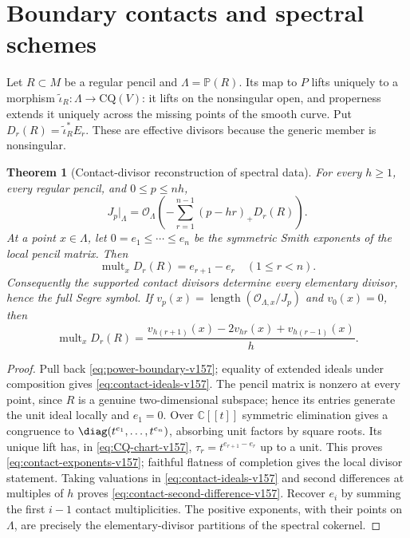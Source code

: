 \documentclass[11pt,reqno]{amsart}
\numberwithin{equation}{section}
\newtheorem{theorem}{Theorem}[section]
\theoremstyle{definition}\newtheorem{definition}[theorem]{Definition}
\theoremstyle{remark}\newtheorem{remark}[theorem]{Remark}
\newcommand{\C}{\mathbb C}\newcommand{\Q}{\mathbb Q}
\newcommand{\Pj}{\mathbb P}\newcommand{\A}{\mathbb A}
\newcommand{\OO}{\mathcal O}\newcommand{\II}{\mathcal I}
\DeclareMathOperator{\length}{length}
\begin{document}
\section{Boundary contacts and spectral schemes}
\label{sec:boundary-contacts-v157}
Let $R\subset M$ be a regular pencil and $\Lambda=\Pj(R)$. Its map
to $P$ lifts uniquely to a morphism
$\widetilde\iota_R:\Lambda\to\mathrm{CQ}(V)$: it lifts on the
nonsingular open, and properness extends it uniquely across the missing
points of the smooth curve. Put
$D_r(R)=\widetilde\iota_R^*E_r$. These are effective divisors because
the generic member is nonsingular.

\begin{theorem}[Contact-divisor reconstruction of spectral data]
\label{thm:contact-Segre-v157}
For every $h\geq1$, every regular pencil, and $0\leq p\leq nh$,
\begin{equation}\label{eq:contact-ideals-v157}
 J_p|_\Lambda=\OO_\Lambda\left(-\sum_{r=1}^{n-1}(p-hr)_+D_r(R)\right).
\end{equation}
At a point $x\in\Lambda$, let $0=e_1\leq\cdots\leq e_n$ be the
symmetric Smith exponents of the local pencil matrix. Then
\begin{equation}\label{eq:contact-exponents-v157}
 \operatorname{mult}_xD_r(R)=e_{r+1}-e_r\quad(1\leq r<n).
\end{equation}
Consequently the supported contact divisors determine every elementary
divisor, hence the full Segre symbol. If
$v_p(x)=\length(\OO_{\Lambda,x}/J_p)$ and $v_0(x)=0$, then
\begin{equation}\label{eq:contact-second-difference-v157}
 \operatorname{mult}_xD_r(R)=
 \frac{v_{h(r+1)}(x)-2v_{hr}(x)+v_{h(r-1)}(x)}{h}.
\end{equation}
\end{theorem}
\begin{proof}
Pull back \eqref{eq:power-boundary-v157}; equality of extended ideals
under composition gives \eqref{eq:contact-ideals-v157}.
The pencil matrix is nonzero at every point, since $R$ is a genuine
two-dimensional subspace; hence its entries generate the unit ideal
locally and $e_1=0$. Over $\C[[t]]$ symmetric elimination gives a
congruence to $\diag(t^{e_1},\ldots,t^{e_n})$, absorbing unit factors
by square roots. Its unique lift has, in
\eqref{eq:CQ-chart-v157}, $\tau_r=t^{e_{r+1}-e_r}$ up to a unit.
This proves \eqref{eq:contact-exponents-v157}; faithful flatness of
completion gives the local divisor statement. Taking valuations in
\eqref{eq:contact-ideals-v157} and second differences at multiples of
$h$ proves \eqref{eq:contact-second-difference-v157}.
Recover $e_i$ by summing the first $i-1$ contact multiplicities. The
positive exponents, with their points on $\Lambda$, are precisely
the elementary-divisor partitions of the spectral cokernel.
\end{proof}
\end{document}
